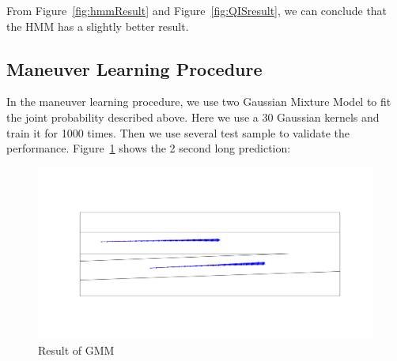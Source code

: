 \documentclass[conference]{IEEEtran}
\begin{document}
From Figure~\ref{fig:hmmResult} and Figure~\ref{fig:QISresult}, we can conclude that the HMM has a slightly better result.
\subsection{Maneuver Learning Procedure}
In the maneuver learning procedure, we use two Gaussian Mixture Model to fit the joint probability described above. Here we use a 30 Gaussian kernels and train it for 1000 times. Then we use several test sample to validate the performance. Figure~\ref{fig:gmmResult} shows the 2 second long prediction:

\begin{figure}[h]
	\centering
	\includegraphics[scale = 0.2]{gmm_2s.png}
	\caption{Result of GMM}
	\label{fig:gmmResult}
\end{figure}
\end{document}
